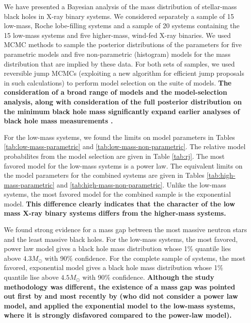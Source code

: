 \documentclass[preprint]{aastex}
\newcommand{\Msun}{M_\odot}
\newcommand{\changed}[1]{{\bf #1 }}
\begin{document}
We have presented a Bayesian analysis of the mass distribution of
stellar-mass black holes in X-ray binary systems.  We considered
separately a sample of 15 low-mass, Roche lobe-filling systems and a
sample of 20 systems containing the 15 low-mass systems and five
higher-mass, wind-fed X-ray binaries.  We used MCMC methods to sample
the posterior distributions of the parameters for five parametric
models and five non-parametric (histogram) models for the mass
distribution that are implied by these data.  For both sets of
samples, we used reversible jump MCMCs (exploiting a new algorithm for
efficient jump proposals in such calculations) to perform model
selection on the suite of models.  \changed{The consideration of a
  broad range of models and the model-selection analysis, along with
  consideration of the full posterior distribution on the minimum
  black hole mass significantly expand earlier analyses of black hole
  mass measurements \citep{Bailyn1998,Ozel2010}.}

For the low-mass systems, we found the limits on model parameters in
Tables \ref{tab:low-mass-parametric} and
\ref{tab:low-mass-non-parametric}.  The relative model probabilites
from the model selection are given in Table \ref{tab:rj}.  The most
favored model for the low-mass systems is a power law.  The equivalent
limits on the model parameters for the combined systems are given in
Tables \ref{tab:high-mass-parametric} and
\ref{tab:high-mass-non-parametric}.  Unlike the low-mass systems, the
most favored model for the combined sample is the exponential model.
\changed{This difference clearly indicates that the character of the
  low mass X-ray binary systems differs from the higher-mass systems.}

We found strong evidence for a mass gap between the most massive
neutron stars and the least massive black holes.  For the low-mass
systems, the most favored, power law model gives a black hole mass
distribution whose 1\% quantile lies above $4.3 \Msun$ with 90\%
confidence.  For the complete sample of systems, the most favored,
exponential model gives a black hole mass distribution whose 1\%
quantile lise above $4.5 \Msun$ with 90\% confidence.
\changed{Although the study methodology was different, the existence
  of a mass gap was pointed out first by \citet{Bailyn1998} and most
  recently by \citet{Ozel2010} (who did not consider a power law
  model, and applied the exponential model to the low-mass systems,
  where it is strongly disfavored compared to the power-law model).}
\end{document}
